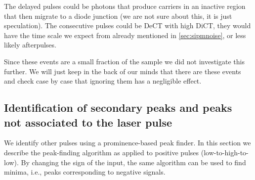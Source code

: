 \begin{table}
    
    
    
\end{table}


The delayed pulses could be photons that produce carriers in an inactive region
that then migrate to a diode junction (we are not sure about this, it is just
speculation). The consecutive pulses could be DeCT with high DiCT, they would
have the time scale we expect from \cite[fig.~3.8~p.~54]{savarese2018} already
mentioned in \autoref{sec:sipmnoise}, or less likely afterpulses.

Since these events are a small fraction of the sample we did not investigate
this further. We will just keep in the back of our minds that there are these
events and check case by case that ignoring them has a negligible effect.

\subsection{Identification of secondary peaks and peaks not associated to the
laser pulse}

We identify other pulses using a prominence-based peak finder. In this section
we describe the peak-finding algorithm as applied to positive pulses
(low-to-high-to-low). By changing the sign of the input, the same algorithm can
be used to find minima, i.e., peaks corresponding to negative signals.

